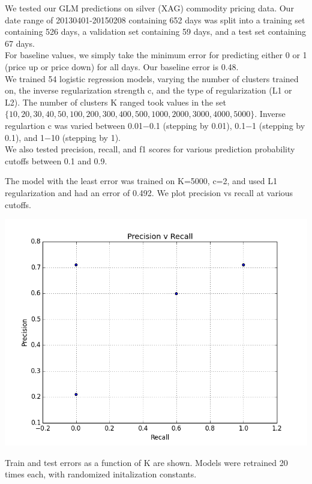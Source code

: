 We tested our GLM predictions on silver (XAG) commodity pricing data. Our date range of 20130401-20150208 containing 652 days was split into a training set containing 526 days, a validation set containing 59 days, and a test set containing 67 days.\\

For baseline values, we simply take the minimum error for predicting either 0 or 1 (price up or price down) for all days. Our baseline error is 0.48.\\

We trained 54 logistic regression models, varying the number of clusters trained on, the inverse regularization strength c, and the type of regularization (L1 or L2). The number of clusters K ranged took values in the set $\{10,20,30,40,50,100,200,300,400,500,1000,2000,3000,4000,5000\}$. Inverse regulartion c was varied between 0.01−0.1 (stepping by 0.01), 0.1−1 (stepping by 0.1), and 1−10 (stepping by 1).\\

We also tested precision, recall, and f1 scores for various prediction probability cutoffs between 0.1 and 0.9.

The model with the least error was trained on K=5000, c=2, and used L1 regularization and had an error of 0.492. We plot precision vs recall at various cutoffs. 

\includegraphics{precision_v_recall.png}

Train and test errors as a function of K are shown. Models were retrained 20 times each, with randomized initalization constants.


